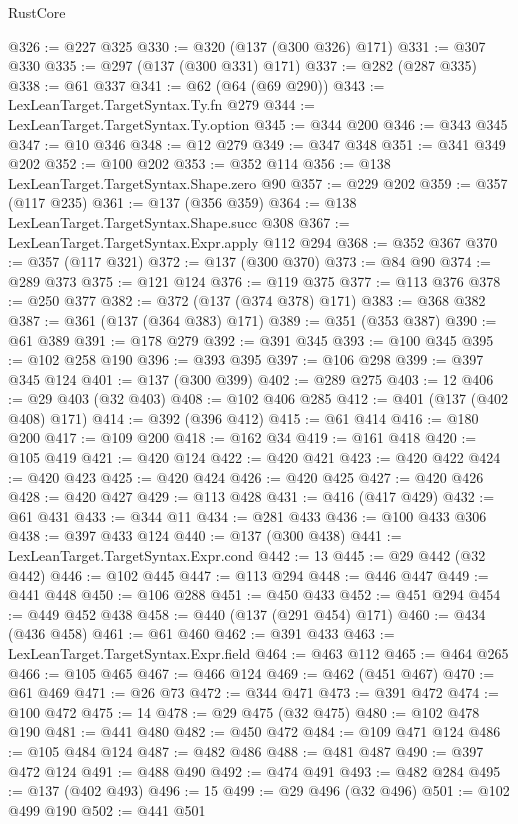 \begin{lexlean}{RustCore}
\begin{coremodule}
{\begin{coremodule}
{{{{{{{{{{{{{{{{{{{{{{{{{{{{{{{{{{{{{{{{{{{{{{{@326 := @227 @325
@330 := @320 (@137 (@300 @326) @171)
@331 := @307 @330
@335 := @297 (@137 (@300 @331) @171)
@337 := @282 (@287 @335)
@338 := @61 @337
@341 := @62 (@64 (@69 @290))
@343 := LexLeanTarget.TargetSyntax.Ty.fn @279
@344 := LexLeanTarget.TargetSyntax.Ty.option
@345 := @344 @200
@346 := @343 @345
@347 := @10 @346
@348 := @12 @279
@349 := @347 @348
@351 := @341 @349 @202
@352 := @100 @202
@353 := @352 @114
@356 := @138 LexLeanTarget.TargetSyntax.Shape.zero @90
@357 := @229 @202
@359 := @357 (@117 @235)
@361 := @137 (@356 @359)
@364 := @138 LexLeanTarget.TargetSyntax.Shape.succ @308
@367 := LexLeanTarget.TargetSyntax.Expr.apply @112 @294
@368 := @352 @367
@370 := @357 (@117 @321)
@372 := @137 (@300 @370)
@373 := @84 @90
@374 := @289 @373
@375 := @121 @124
@376 := @119 @375
@377 := @113 @376
@378 := @250 @377
@382 := @372 (@137 (@374 @378) @171)
@383 := @368 @382
@387 := @361 (@137 (@364 @383) @171)
@389 := @351 (@353 @387)
@390 := @61 @389
@391 := @178 @279
@392 := @391 @345
@393 := @100 @345
@395 := @102 @258 @190
@396 := @393 @395
@397 := @106 @298
@399 := @397 @345 @124
@401 := @137 (@300 @399)
@402 := @289 @275
@403 := 12
@406 := @29 @403 (@32 @403)
@408 := @102 @406 @285
@412 := @401 (@137 (@402 @408) @171)
@414 := @392 (@396 @412)
@415 := @61 @414
@416 := @180 @200
@417 := @109 @200
@418 := @162 @34
@419 := @161 @418
@420 := @105 @419
@421 := @420 @124
@422 := @420 @421
@423 := @420 @422
@424 := @420 @423
@425 := @420 @424
@426 := @420 @425
@427 := @420 @426
@428 := @420 @427
@429 := @113 @428
@431 := @416 (@417 @429)
@432 := @61 @431
@433 := @344 @11
@434 := @281 @433
@436 := @100 @433 @306
@438 := @397 @433 @124
@440 := @137 (@300 @438)
@441 := LexLeanTarget.TargetSyntax.Expr.cond
@442 := 13
@445 := @29 @442 (@32 @442)
@446 := @102 @445
@447 := @113 @294
@448 := @446 @447
@449 := @441 @448
@450 := @106 @288
@451 := @450 @433
@452 := @451 @294
@454 := @449 @452 @438
@458 := @440 (@137 (@291 @454) @171)
@460 := @434 (@436 @458)
@461 := @61 @460
@462 := @391 @433
@463 := LexLeanTarget.TargetSyntax.Expr.field
@464 := @463 @112
@465 := @464 @265
@466 := @105 @465
@467 := @466 @124
@469 := @462 (@451 @467)
@470 := @61 @469
@471 := @26 @73
@472 := @344 @471
@473 := @391 @472
@474 := @100 @472
@475 := 14
@478 := @29 @475 (@32 @475)
@480 := @102 @478 @190
@481 := @441 @480
@482 := @450 @472
@484 := @109 @471 @124
@486 := @105 @484 @124
@487 := @482 @486
@488 := @481 @487
@490 := @397 @472 @124
@491 := @488 @490
@492 := @474 @491
@493 := @482 @284
@495 := @137 (@402 @493)
@496 := 15
@499 := @29 @496 (@32 @496)
@501 := @102 @499 @190
@502 := @441 @501
}}}}}}}}}}}}}}}}}}}}}}}}}}}}}}}}}}}}}}}}}}}}}}}
\end{coremodule}}
\end{coremodule}
\end{lexlean}
